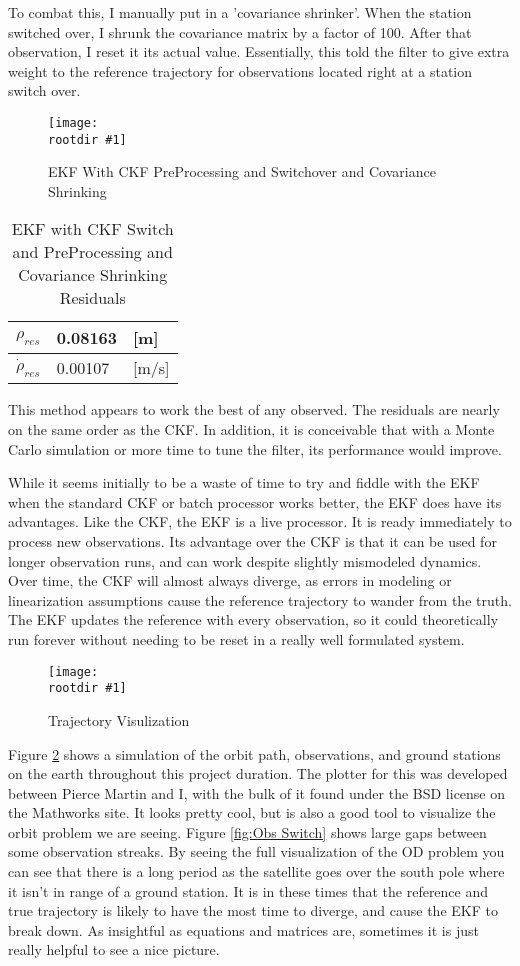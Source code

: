 \documentclass[12pt,a4paper,oneside]{article}
\numberwithin{equation}{section}   		%
\newcommand{\rootdir}{./Figures/}
\newcommand{\fig}[3]{
			\begin{figure}
				\centering
				\texttt{[image: \\rootdir \#1]}
				\caption{#2}
				\label{#3}
			\end{figure}
			}
\begin{document}
To combat this, I manually put in a 'covariance shrinker'. When the station switched over, I shrunk the covariance matrix by a factor of 100. After that observation, I reset it its actual value. Essentially, this told the filter to give extra weight to the reference trajectory for observations located right at a station switch over. 


\fig{EKF4.eps}{EKF With CKF PreProcessing and Switchover and Covariance Shrinking}{fig:EKF4}

\begin{table}[H]
\centering
	\begin{tabular}{|l|l|l|}
		\hline
		$\rho_{res}$		&	0.08163 		& [m]		\\\hline
		$\dot{\rho}_{res}$	&	0.00107 		& [m/s] 	\\\hline
	\end{tabular}
	\caption{EKF with CKF Switch and PreProcessing and Covariance Shrinking Residuals}
	\label{tab:EKF4}
\end{table}

This method appears to work the best of any observed. The residuals are nearly on the same order as the CKF. In addition, it is conceivable that with a Monte Carlo simulation or more time to tune the filter, its performance would improve. 

While it seems initially to be a waste of time to try and fiddle with the EKF when the standard CKF or batch processor works better, the EKF does have its advantages. Like the CKF, the EKF is a live processor. It is ready immediately to process new observations. Its advantage over the CKF is that it can be used for longer observation runs, and can work despite slightly mismodeled dynamics. Over time, the CKF will almost always diverge, as errors in modeling or linearization assumptions cause the reference trajectory to wander from the truth. The EKF updates the reference with every observation, so it could theoretically run forever without needing to be reset in a really well formulated system. 

\fig{PrettyTraj.png}{Trajectory Visulization}{fig:Pretty Traj}

Figure \ref{fig:Pretty Traj} shows a simulation of the orbit path, observations, and ground stations on the earth throughout this project duration. The plotter for this was developed between Pierce Martin and I, with the bulk of it found under the BSD license on the Mathworks site. It looks pretty cool, but is also a good tool to visualize the orbit problem we are seeing. Figure \ref{fig:Obs Switch} shows large gaps between some observation streaks. By seeing the full visualization of the OD problem you can see that there is a long period as the satellite goes over the south pole where it isn't in range of a ground station. It is in these times that the reference and true trajectory is likely to have the most time to diverge, and cause the EKF to break down. As insightful as equations and matrices are, sometimes it is just really helpful to see a nice picture. 
\end{document}
